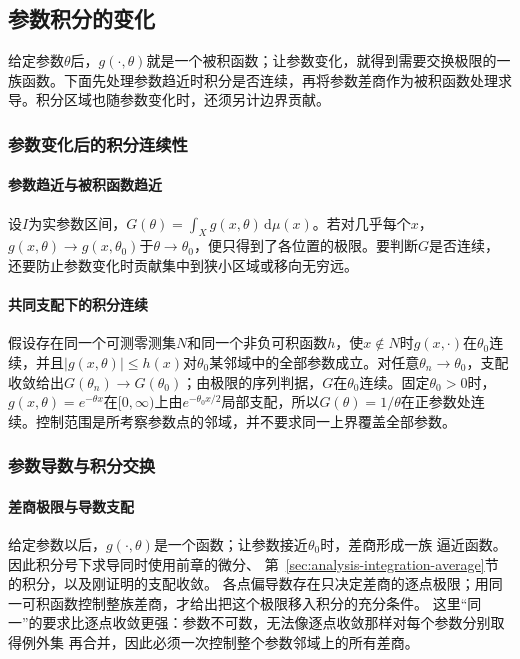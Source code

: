 \subsection{参数积分的变化}

给定参数$\theta$后，$g(\cdot,\theta)$就是一个被积函数；让参数变化，就得到需要交换极限的一族函数。下面先处理参数趋近时积分是否连续，再将参数差商作为被积函数处理求导。积分区域也随参数变化时，还须另计边界贡献。

\subsubsection{参数变化后的积分连续性}
\paragraph{参数趋近与被积函数趋近}

设$I$为实参数区间，$G(\theta)=\int_Xg(x,\theta)\,\mathrm d\mu(x)$。若对几乎每个$x$，$g(x,\theta)\to g(x,\theta_0)$于$\theta\to\theta_0$，便只得到了各位置的极限。要判断$G$是否连续，还要防止参数变化时贡献集中到狭小区域或移向无穷远。

\paragraph{共同支配下的积分连续}

假设存在同一个可测零测集$N$和同一个非负可积函数$h$，使$x\notin N$时$g(x,\cdot)$在$\theta_0$连续，并且$|g(x,\theta)|\leq h(x)$对$\theta_0$某邻域中的全部参数成立。对任意$\theta_n\to\theta_0$，支配收敛给出$G(\theta_n)\to G(\theta_0)$；由极限的序列判据，$G$在$\theta_0$连续。固定$\theta_0>0$时，$g(x,\theta)=e^{-\theta x}$在$[0,\infty)$上由$e^{-\theta_0x/2}$局部支配，所以$G(\theta)=1/\theta$在正参数处连续。控制范围是所考察参数点的邻域，并不要求同一上界覆盖全部参数。

\subsubsection{参数导数与积分交换}
\paragraph{差商极限与导数支配}

给定参数以后，$g(\cdot,\theta)$是一个函数；让参数接近$\theta_0$时，差商形成一族
逼近函数。因此积分号下求导同时使用前章的微分、
第~\ref{sec:analysis-integration-average}节的积分，以及刚证明的支配收敛。
各点偏导数存在只决定差商的逐点极限；用同一可积函数控制整族差商，才给出把这个极限移入积分的充分条件。
这里“同一”的要求比逐点收敛更强：参数不可数，无法像逐点收敛那样对每个参数分别取得例外集
再合并，因此必须一次控制整个参数邻域上的所有差商。


